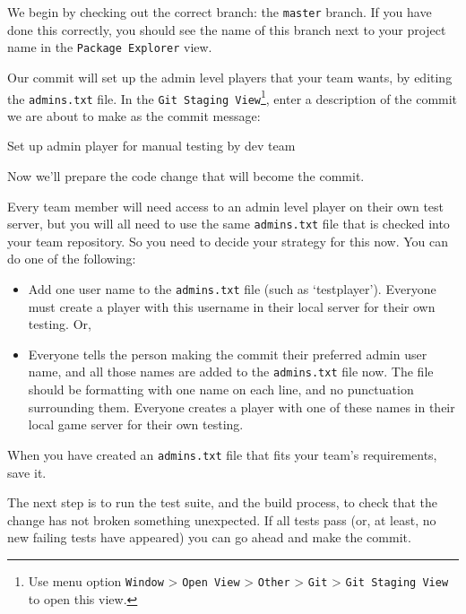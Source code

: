 \documentclass[
]{book}
\newenvironment{Shaded}{\begin{snugshade}}{\end{snugshade}}
\newcommand{\NormalTok}[1]{#1}
\providecommand{\tightlist}{%
  \setlength{\itemsep}{0pt}\setlength{\parskip}{0pt}}
\begin{document}
We begin by checking out the correct branch: the \texttt{master} branch. If you have done this correctly, you should see the name of this branch next to your project name in the \texttt{Package\ Explorer} view.

Our commit will set up the admin level players that your team wants, by editing the \texttt{admins.txt} file. In the \texttt{Git\ Staging\ View}\footnote{Use menu option \texttt{Window} \textgreater{} \texttt{Open\ View} \textgreater{} \texttt{Other} \textgreater{} \texttt{Git} \textgreater{} \texttt{Git\ Staging\ View} to open this view.}, enter a description of the commit we are about to make as the commit message:

\begin{Shaded}
\begin{Highlighting}[]
\NormalTok{Set up admin player for manual testing by dev team}
\end{Highlighting}
\end{Shaded}

Now we'll prepare the code change that will become the commit.

Every team member will need access to an admin level player on their own test server, but you will all need to use the same \texttt{admins.txt} file that is checked into your team repository. So you need to decide your strategy for this now. You can do one of the following:

\begin{itemize}
\tightlist
\item
  Add one user name to the \texttt{admins.txt} file (such as `testplayer'). Everyone must create a player with this username in their local server for their own testing. Or,
\item
  Everyone tells the person making the commit their preferred admin user name, and all those names are added to the \texttt{admins.txt} file now. The file should be formatting with one name on each line, and no punctuation surrounding them. Everyone creates a player with one of these names in their local game server for their own testing.
\end{itemize}

When you have created an \texttt{admins.txt} file that fits your team's requirements, save it.

The next step is to run the test suite, and the build process, to check that the change has not broken something unexpected. If all tests pass (or, at least, no new failing tests have appeared) you can go ahead and make the commit.
\end{document}

